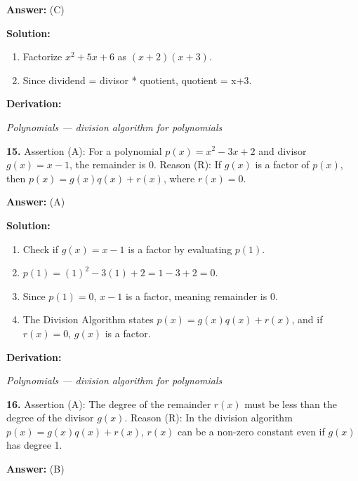 \documentclass[12pt,a4paper]{exam}
\newcommand{\fitmath}[1]{%
  \sbox{\schmathbox}{$\displaystyle #1$}%
  \ifdim\wd\schmathbox>\linewidth
    \resizebox{\linewidth}{!}{\usebox{\schmathbox}}%
  \else
    \usebox{\schmathbox}%
  \fi}
\begin{document}
\begin{questions}
\textbf{Answer:}
(C)

\textbf{Solution:}
\begin{enumerate}
  \item Factorize $x^2 + 5x + 6$ as $(x+2)(x+3)$.
  \item Since dividend = divisor * quotient, quotient = x+3.
\end{enumerate}
\textbf{Derivation:}
\begin{center}
\fitmath{\frac{x^2 + 5x + 6}{x+2} = x + 3}
\end{center}
\hfill \textit{Polynomials — division algorithm for polynomials}
\vspace{0.3cm}

\question \textbf{15.} Assertion (A): For a polynomial $p(x) = x^2 - 3x + 2$ and divisor $g(x) = x - 1$, the remainder is 0. Reason (R): If $g(x)$ is a factor of $p(x)$, then $p(x) = g(x)q(x) + r(x)$, where $r(x) = 0$.

\textbf{Answer:}
(A)

\textbf{Solution:}
\begin{enumerate}
  \item Check if $g(x) = x - 1$ is a factor by evaluating $p(1)$.
  \item $p(1) = (1)^2 - 3(1) + 2 = 1 - 3 + 2 = 0$.
  \item Since $p(1) = 0$, $x-1$ is a factor, meaning remainder is 0.
  \item The Division Algorithm states $p(x) = g(x)q(x) + r(x)$, and if $r(x)=0$, $g(x)$ is a factor.
\end{enumerate}
\textbf{Derivation:}
\begin{center}
\fitmath{\begin{aligned}
p(1) = 1^2 - 3(1) + 2 = 0 \\
\implies r(x) = 0
\end{aligned}}
\end{center}
\hfill \textit{Polynomials — division algorithm for polynomials}
\vspace{0.3cm}

\question \textbf{16.} Assertion (A): The degree of the remainder $r(x)$ must be less than the degree of the divisor $g(x)$. Reason (R): In the division algorithm $p(x) = g(x)q(x) + r(x)$, $r(x)$ can be a non-zero constant even if $g(x)$ has degree 1.

\textbf{Answer:}
(B)


\end{questions}
\end{document}
